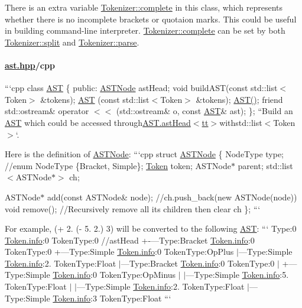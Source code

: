 There is an extra variable {\ttfamily \hyperlink{class_tokenizer_a330a4cce0cbf3ebfbe601d97022d1ed4}{Tokenizer\+::complete}} in this class, which represents whether there is no incomplete brackets or quotaion marks. This could be useful in building command-\/line interpreter. {\ttfamily \hyperlink{class_tokenizer_a330a4cce0cbf3ebfbe601d97022d1ed4}{Tokenizer\+::complete}} can be set by both {\ttfamily \hyperlink{class_tokenizer_a8bd8a4eb5df764f6128028daa0e9044b}{Tokenizer\+::split}} and {\ttfamily \hyperlink{class_tokenizer_ae928efe72c00908a3529747b4cfd01d5}{Tokenizer\+::parse}}.

\paragraph*{\hyperlink{ast_8hpp}{ast.\+hpp}/cpp}

```cpp class \hyperlink{class_a_s_t}{A\+S\+T} \{ public\+: \hyperlink{struct_a_s_t_node}{A\+S\+T\+Node} ast\+Head; void build\+A\+S\+T(const std\+::list$<$\+Token$>$ \&tokens); \hyperlink{class_a_s_t}{A\+S\+T} (const std\+::list$<$\+Token$>$ \&tokens); \hyperlink{class_a_s_t}{A\+S\+T()}; friend std\+::ostream\& operator $<$$<$ (std\+::ostream\& o, const \hyperlink{class_a_s_t}{A\+S\+T}\& ast); \}; ``{\ttfamily  Build an \hyperlink{class_a_s_t}{A\+S\+T} which could be accessed through}\hyperlink{class_a_s_t_aaa30ec872fa91242f5c9cb7a5041b307}{A\+S\+T.\+ast\+Head$<$tt$>$}withstd\+::list$<$\+Token$>$`.

Here is the definition of {\ttfamily \hyperlink{struct_a_s_t_node}{A\+S\+T\+Node}}\+: ```cpp struct \hyperlink{struct_a_s_t_node}{A\+S\+T\+Node} \{ Node\+Type type; //enum Node\+Type \{Bracket, Simple\}; \hyperlink{struct_token}{Token} token; A\+S\+T\+Node$\ast$ parent; std\+::list$<$\+A\+S\+T\+Node$\ast$$>$ ch;

A\+S\+T\+Node$\ast$ add(const A\+S\+T\+Node\& node); //ch.push\+\_\+back(new A\+S\+T\+Node(node)) void remove(); //\+Recursively remove all its children then clear ch \}; ```

For example, {\ttfamily (+ 2. (-\/ 5. 2.) 3)} will be converted to the following \hyperlink{class_a_s_t}{A\+S\+T}\+: ``` Type\+:0 \hyperlink{struct_token_a4c338f6ca199f4a8575e877d36d03a06}{Token.\+info}\+:0 Token\+Type\+:0 //ast\+Head +-\/---Type\+:Bracket \hyperlink{struct_token_a4c338f6ca199f4a8575e877d36d03a06}{Token.\+info}\+:0 Token\+Type\+:0 +---Type\+:Simple \hyperlink{struct_token_a4c338f6ca199f4a8575e877d36d03a06}{Token.\+info}\+:0 Token\+Type\+:Op\+Plus $\vert$---Type\+:Simple \hyperlink{struct_token_a4c338f6ca199f4a8575e877d36d03a06}{Token.\+info}\+:2. Token\+Type\+:Float $\vert$---Type\+:Bracket \hyperlink{struct_token_a4c338f6ca199f4a8575e877d36d03a06}{Token.\+info}\+:0 Token\+Type\+:0 $\vert$ +---Type\+:Simple \hyperlink{struct_token_a4c338f6ca199f4a8575e877d36d03a06}{Token.\+info}\+:0 Token\+Type\+:Op\+Minus $\vert$ $\vert$---Type\+:Simple \hyperlink{struct_token_a4c338f6ca199f4a8575e877d36d03a06}{Token.\+info}\+:5. Token\+Type\+:Float $\vert$ $\vert$---Type\+:Simple \hyperlink{struct_token_a4c338f6ca199f4a8575e877d36d03a06}{Token.\+info}\+:2. Token\+Type\+:Float $\vert$---Type\+:Simple \hyperlink{struct_token_a4c338f6ca199f4a8575e877d36d03a06}{Token.\+info}\+:3 Token\+Type\+:Float ```

